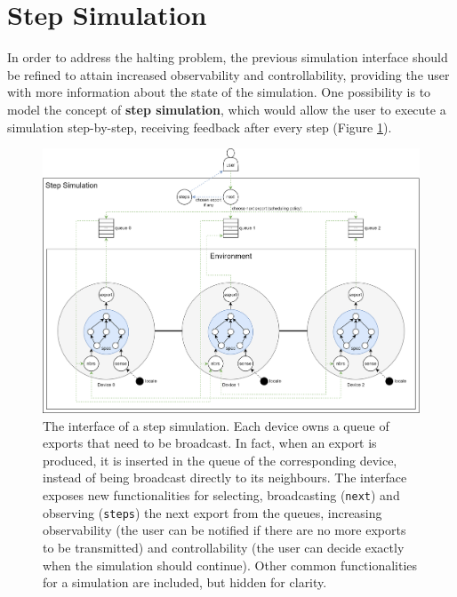
\section{Step Simulation}
\label{section:design:step-simulation}

In order to address the halting problem, the previous simulation interface
should be refined to attain increased observability and controllability,
providing the user with more information about the state of the simulation. One
possibility is to model the concept of \textbf{step simulation}, which would
allow the user to execute a simulation step-by-step, receiving feedback after
every step (Figure \ref{figure:step-simulation}).

\begin{figure}[!ht]
  \centering
  \includegraphics[width=1\textwidth]{resources/figures/step-simulation.png}
  \caption{The interface of a step simulation. Each device owns a queue of
    exports that need to be broadcast. In fact, when an export is produced, it
    is inserted in the queue of the corresponding device, instead of being
    broadcast directly to its neighbours. The interface exposes new
    functionalities for selecting, broadcasting (\texttt{next}) and observing
    (\texttt{steps}) the next export from the queues, increasing observability
    (the user can be notified if there are no more exports to be transmitted)
    and controllability (the user can decide exactly when the simulation should
    continue). Other common functionalities for a simulation are included, but
    hidden for clarity.}
  \label{figure:step-simulation}
\end{figure}

